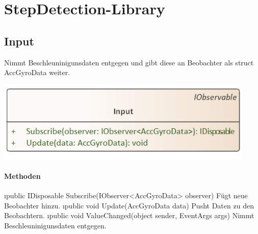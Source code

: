 \documentclass[../entwurf.tex]{subfiles}
\begin{document}
\section{StepDetection-Library}
    \subsection{Input}
        Nimmt Beschleuninigunsdaten entgegen und gibt diese an Beobachter als struct AccGyroData weiter.
        \begin{center}
            \includegraphics[page=1,width=350pt,keepaspectratio]{../uml_klassen/StepDetectionLib/Input.png}
        \end{center}
        \paragraph{Methoden}
        \begin{itemize}
            \i{public IDisposable Subscribe(IObserver<AccGyroData> observer)} Fügt neue Beobachter hinzu.
            \i{public void Update(AccGyroData data)} Pusht Daten zu den Beobachtern.
            \i{public void ValueChanged(object sender, EventArgs args)} Nimmt Beschleuninigunsdaten entgegen.
        \end{itemize}
\end{document}
